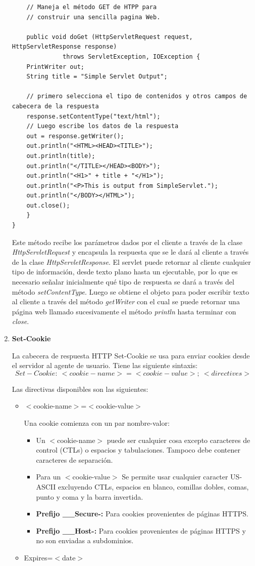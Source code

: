 \documentclass[a4paper,12pt]{article}
\begin{document}
\begin{enumerate}
\begin{lstlisting}
    // Maneja el método GET de HTPP para 
    // construir una sencilla pagina Web.

    public void doGet (HttpServletRequest request, HttpServletResponse response)
              throws ServletException, IOException {
    PrintWriter out;
    String title = "Simple Servlet Output";

    // primero selecciona el tipo de contenidos y otros campos de cabecera de la respuesta
    response.setContentType("text/html");
    // Luego escribe los datos de la respuesta
    out = response.getWriter();
    out.println("<HTML><HEAD><TITLE>");
    out.println(title);
    out.println("</TITLE></HEAD><BODY>");
    out.println("<H1>" + title + "</H1>");
    out.println("<P>This is output from SimpleServlet.");
    out.println("</BODY></HTML>");
    out.close();
    }
}
 \end{lstlisting}

 Este método recibe los parámetros dados por el cliente a través de la clase \textit{HttpServletRequest} y encapsula la respuesta que se le dará al cliente a 
 través de la clase \textit{HttpServletResponse}. El servlet puede retornar al cliente cualquier tipo de información, desde texto plano hasta un ejecutable, por lo que
 es necesario señalar inicialmente qué tipo de respuesta se dará a través del método \textit{setContentType}. Luego se obtiene el objeto para poder escribir texto
 al cliente a través del método \textit{getWriter} con el cual se puede retornar una página web llamado sucesivamente el método \textit{println} hasta
 terminar con \textit{close}.

 \item \textbf{Set-Cookie}
 
 La cabecera de respuesta HTTP Set-Cookie se usa para enviar cookies desde el servidor al agente de usuario. Tiene las siguiente sintaxis:
 $$Set-Cookie:\:<cookie-name>=<cookie-value>;\:<directives> $$
 
 Las directivas disponibles son las siguientes:
 
 \begin{itemize}
  \item $<$cookie-name$>$=$<$cookie-value$>$
  
  Una cookie comienza con un par nombre-valor:
  \begin{itemize}
   \item Un $<$cookie-name$>$ puede ser cualquier cosa excepto caracteres de control (CTLs) o espacios y tabulaciones. Tampoco debe contener caracteres de separación.
   \item Para un $<$cookie-value$>$ Se permite usar cualquier caracter US-ASCII excluyendo CTLs, espacios en blanco, comillas dobles, comas, punto y coma y la barra invertida.
   \item \textbf{Prefijo \_\_Secure-:} Para cookies provenientes de páginas HTTPS.
   \item \textbf{Prefijo \_\_Host-:} Para cookies provenientes de páginas HTTPS y no son enviadas a subdominios.
  \end{itemize}
  \item Expires=$<$date$>$
  

\end{itemize}
\end{enumerate}
\end{document}
